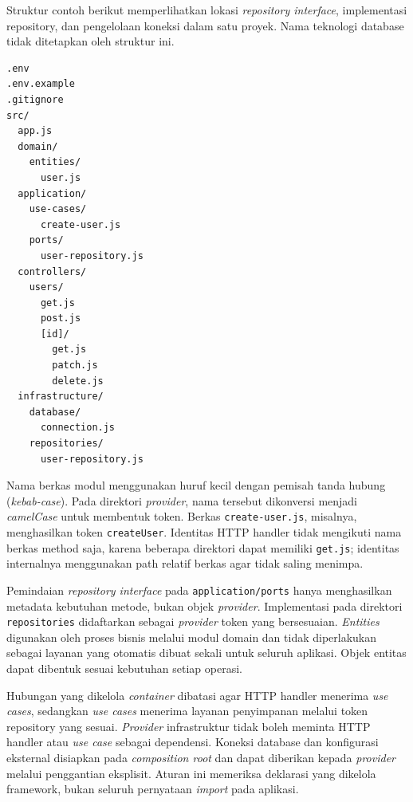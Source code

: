 \documentclass[12pt,a4paper,oneside]{report}
\begin{document}
Struktur contoh berikut memperlihatkan lokasi \textit{repository interface}, implementasi repository, dan pengelolaan koneksi dalam satu proyek. Nama teknologi database tidak ditetapkan oleh struktur ini.
\begin{samepage}
\begin{singlespace}
\begin{verbatim}
.env
.env.example
.gitignore
src/
  app.js
  domain/
    entities/
      user.js
  application/
    use-cases/
      create-user.js
    ports/
      user-repository.js
  controllers/
    users/
      get.js
      post.js
      [id]/
        get.js
        patch.js
        delete.js
  infrastructure/
    database/
      connection.js
    repositories/
      user-repository.js
\end{verbatim}
\end{singlespace}
\end{samepage}

Nama berkas modul menggunakan huruf kecil dengan pemisah tanda hubung (\textit{kebab-case}). Pada direktori \textit{provider}, nama tersebut dikonversi menjadi \textit{camelCase} untuk membentuk token. Berkas \texttt{create-user.js}, misalnya, menghasilkan token \texttt{createUser}. Identitas HTTP handler tidak mengikuti nama berkas method saja, karena beberapa direktori dapat memiliki \texttt{get.js}; identitas internalnya menggunakan path relatif berkas agar tidak saling menimpa.

Pemindaian \textit{repository interface} pada \texttt{application/\allowbreak ports} hanya menghasilkan metadata kebutuhan metode, bukan objek \textit{provider}. Implementasi pada direktori \texttt{repositories} didaftarkan sebagai \textit{provider} token yang bersesuaian. \textit{Entities} digunakan oleh proses bisnis melalui modul domain dan tidak diperlakukan sebagai layanan yang otomatis dibuat sekali untuk seluruh aplikasi. Objek entitas dapat dibentuk sesuai kebutuhan setiap operasi.

Hubungan yang dikelola \textit{container} dibatasi agar HTTP handler menerima \textit{use cases}, sedangkan \textit{use cases} menerima layanan penyimpanan melalui token repository yang sesuai. \textit{Provider} infrastruktur tidak boleh meminta HTTP handler atau \textit{use case} sebagai dependensi. Koneksi database dan konfigurasi eksternal disiapkan pada \textit{composition root} dan dapat diberikan kepada \textit{provider} melalui penggantian eksplisit. Aturan ini memeriksa deklarasi yang dikelola framework, bukan seluruh pernyataan \textit{import} pada aplikasi.
\end{document}
